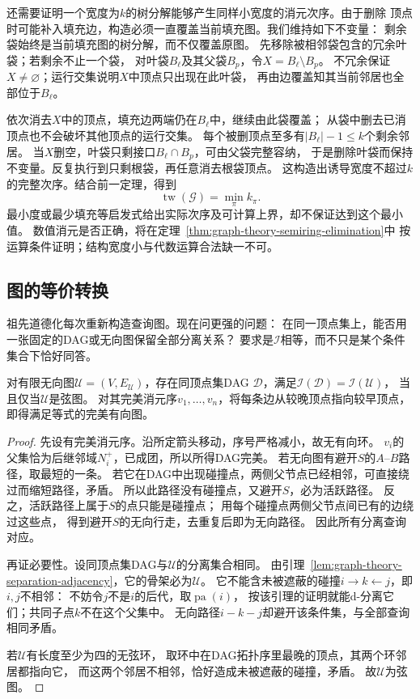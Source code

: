 还需要证明一个宽度为\(k\)的树分解能够产生同样小宽度的消元次序。由于删除
顶点时可能补入填充边，构造必须一直覆盖当前填充图。我们维持如下不变量：
剩余袋始终是当前填充图的树分解，而不仅覆盖原图。
先移除被相邻袋包含的冗余叶袋；若剩余不止一个袋，
对叶袋\(B_\ell\)及其父袋\(B_p\)，令\(X=B_\ell\setminus B_p\)。
不冗余保证\(X\neq\varnothing\)；运行交集说明\(X\)中顶点只出现在此叶袋，
再由边覆盖知其当前邻居也全部位于\(B_\ell\)。

依次消去\(X\)中的顶点，填充边两端仍在\(B_\ell\)中，继续由此袋覆盖；
从袋中删去已消顶点也不会破坏其他顶点的运行交集。
每个被删顶点至多有\(|B_\ell|-1\leq k\)个剩余邻居。
当\(X\)删空，叶袋只剩接口\(B_\ell\cap B_p\)，可由父袋完整容纳，
于是删除叶袋而保持不变量。反复执行到只剩根袋，再任意消去根袋顶点。
这构造出诱导宽度不超过\(k\)的完整次序。结合前一定理，得到
\[
  \operatorname{tw}(\mathcal G)=\min_\pi k_\pi.
\]
最小度或最少填充等启发式给出实际次序及可计算上界，却不保证达到这个最小值。
数值消元是否正确，将在定理~\ref{thm:graph-theory-semiring-elimination}中
按运算条件证明；结构宽度小与代数运算合法缺一不可。

\subsection{图的等价转换}
\label{sec:graph-theory-separation-correspondence}

祖先道德化每次重新构造查询图。现在问更强的问题：
在同一顶点集上，能否用一张固定的DAG或无向图保留全部分离关系？
要求是\(\mathcal I\)相等，而不只是某个条件集合下恰好同答。

\begin{theorem}[无向图的完美有向图表示]
  \label{thm:graph-theory-chordal-perfect}
  对有限无向图\(\mathcal U=(V,E_{\mathcal U})\)，存在同顶点集DAG
  \(\mathcal D\)，满足\(\mathcal I(\mathcal D)=\mathcal I(\mathcal U)\)，
  当且仅当\(\mathcal U\)是弦图。
  对其完美消元序\(v_1,\ldots,v_n\)，将每条边从较晚顶点指向较早顶点，
  即得满足等式的完美有向图。
\end{theorem}

\begin{proof}
先设有完美消元序。沿所定箭头移动，序号严格减小，故无有向环。
\(v_i\)的父集恰为后继邻域\(N_i^+\)，已成团，所以所得DAG完美。
若无向图有避开\(S\)的\(A\)--\(B\)路径，取最短的一条。
若它在DAG中出现碰撞点，两侧父节点已经相邻，可直接绕过而缩短路径，矛盾。
所以此路径没有碰撞点，又避开\(S\)，必为活跃路径。
反之，活跃路径上属于\(S\)的点只能是碰撞点；
用每个碰撞点两侧父节点间已有的边绕过这些点，
得到避开\(S\)的无向行走，去重复后即为无向路径。
因此所有分离查询对应。

再证必要性。设同顶点集DAG与\(\mathcal U\)的分离集合相同。
由引理~\ref{lem:graph-theory-separation-adjacency}，它的骨架必为\(\mathcal U\)。
它不能含未被遮蔽的碰撞\(i\to k\leftarrow j\)，即\(i,j\)不相邻：
不妨令\(j\)不是\(i\)的后代，取\(\operatorname{pa}(i)\)，
按该引理的证明就能d-分离它们；共同子点\(k\)不在这个父集中。
无向路径\(i-k-j\)却避开该条件集，与全部查询相同矛盾。

若\(\mathcal U\)有长度至少为四的无弦环，
取环中在DAG拓扑序里最晚的顶点，其两个环邻居都指向它，
而这两个邻居不相邻，恰好造成未被遮蔽的碰撞，矛盾。
故\(\mathcal U\)为弦图。
\end{proof}

